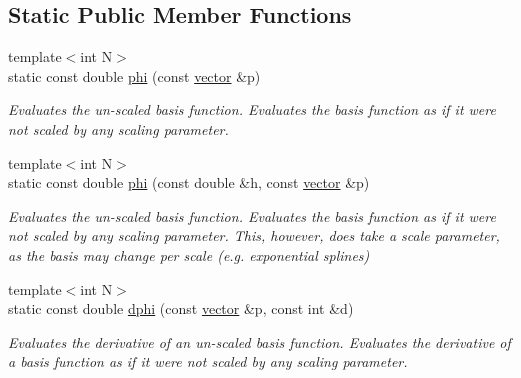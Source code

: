 \subsection*{Static Public Member Functions}
\begin{DoxyCompactItemize}
\item 
\mbox{\label{classsisl_1_1basis__function_ae263cdbf1ad31e828d43af62fd645d6d}} 
{\footnotesize template$<$int N$>$ }\\static const double \hyperlink{classsisl_1_1basis__function_ae263cdbf1ad31e828d43af62fd645d6d}{phi} (const \hyperlink{namespacesisl_a2069bd5374a9be042ff3ce3306d41e1a}{vector} \&p)
\begin{DoxyCompactList}\small\item\em Evaluates the un-\/scaled basis function. Evaluates the basis function as if it were not scaled by any scaling parameter. \end{DoxyCompactList}\item 
\mbox{\label{classsisl_1_1basis__function_a5a0fc716cb31c0b4a39ae9ffef9210dd}} 
{\footnotesize template$<$int N$>$ }\\static const double \hyperlink{classsisl_1_1basis__function_a5a0fc716cb31c0b4a39ae9ffef9210dd}{phi} (const double \&h, const \hyperlink{namespacesisl_a2069bd5374a9be042ff3ce3306d41e1a}{vector} \&p)
\begin{DoxyCompactList}\small\item\em Evaluates the un-\/scaled basis function. Evaluates the basis function as if it were not scaled by any scaling parameter. This, however, does take a scale parameter, as the basis may change per scale (e.\+g. exponential splines) \end{DoxyCompactList}\item 
\mbox{\label{classsisl_1_1basis__function_a08ca4f754c0f9bd937f362c91b37a159}} 
{\footnotesize template$<$int N$>$ }\\static const double \hyperlink{classsisl_1_1basis__function_a08ca4f754c0f9bd937f362c91b37a159}{dphi} (const \hyperlink{namespacesisl_a2069bd5374a9be042ff3ce3306d41e1a}{vector} \&p, const int \&d)
\begin{DoxyCompactList}\small\item\em Evaluates the derivative of an un-\/scaled basis function. Evaluates the derivative of a basis function as if it were not scaled by any scaling parameter. \end{DoxyCompactList}\item 

\end{DoxyCompactItemize}
